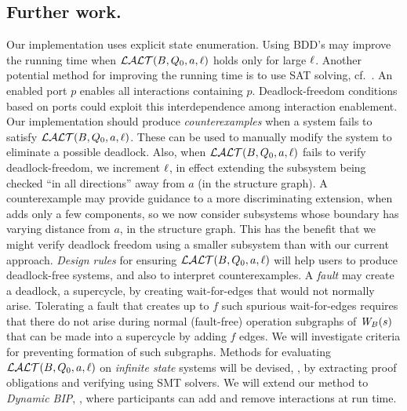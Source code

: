 \subsection{Further work.} 
Our implementation uses explicit state enumeration. %
Using BDD's may improve the running time 
when $\mathcal{LALT}(B, Q_0, a, \ell)$ holds only for large $\ell$.
Another potential method for improving the running time is to use 
SAT solving, cf.\ .
%
%
An enabled port $p$ enables all interactions containing $p$.
Deadlock-freedom conditions based on ports could exploit
this interdependence among interaction enablement.
%
Our implementation should produce \emph{counterexamples} when a system fails to satisfy $\mathcal{LALT}(B, Q_0, a, \ell)$. These can be used to manually modify the system
to eliminate a possible deadlock.  Also, when $\mathcal{LALT}(B, Q_0, a, \ell)$ fails to verify deadlock-freedom, we increment $\ell$, in effect extending the
subsystem being checked ``in all directions'' away from $a$ (in the structure graph). A counterexample may provide guidance to a more discriminating
extension, when adds only a few components, so we now consider subsystems whose boundary has varying distance from $a$, in the structure graph. This
has the benefit that we might verify deadlock freedom using a smaller subsystem than with our current approach.
%
\emph{Design rules} for ensuring $\mathcal{LALT}(B, Q_0, a, \ell)$ will help users to
produce deadlock-free systems, and also to interpret counterexamples.
%
A \emph{fault} may create a deadlock,  \ie a supercycle, by creating 
wait-for-edges that would not normally arise.
Tolerating a fault that creates up to $f$ such spurious wait-for-edges 
requires that there do not arise during normal
(fault-free) operation subgraphs of $\mathit{W}_{B}({s})$ that can be made into a
supercycle by adding $f$ edges. 
We will investigate criteria for preventing formation of such subgraphs.
%
Methods for evaluating $\mathcal{LALT}(B, Q_0, a, \ell)$ on \emph{infinite state} systems will be
devised, \eg, by extracting proof obligations and verifying using SMT solvers.
%
We will extend our method to \emph{Dynamic BIP},
\cite{DBLP:conf/soco/BozgaJMS12}, where participants can add and remove
interactions at run time.


